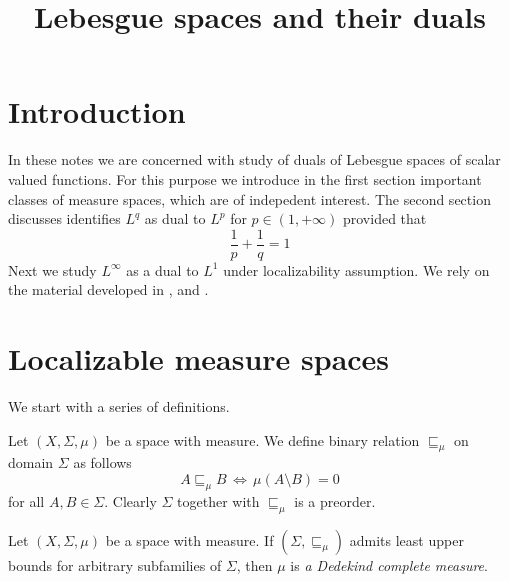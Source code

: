 



\title{Lebesgue spaces and their duals}
\date{}
\maketitle


\section{Introduction}
\noindent
In these notes we are concerned with study of duals of Lebesgue spaces of scalar valued functions. For this purpose we introduce in the first section important classes of measure spaces, which are of indepedent interest. The second section discusses identifies $L^q$ as dual to $L^p$ for $p\in (1,+\infty)$ provided that
$$\frac{1}{p} + \frac{1}{q} = 1$$
Next we study $L^{\infty}$ as a  dual to $L^1$ under localizability assumption. We rely on the material developed in \cite{Introduction_to_measure_theory}, \cite{Integration} and \cite{Radon_Nikodym_Hahn_Jordan_Lebesgue_decomposition}.


\section{Localizable measure spaces}
\noindent
We start with a series of definitions.

\begin{definition}
  Let $(X,\Sigma,\mu)$ be a space with measure. We define binary relation $\sqsubseteq_{\mu}$ on domain $\Sigma$ as follows
  $$A \sqsubseteq_{\mu} B\,\Leftrightarrow\,\mu(A\setminus B) = 0$$
  for all $A, B \in \Sigma$. Clearly $\Sigma$ together with $\sqsubseteq_{\mu}$ is a preorder.
\end{definition}

\begin{definition}
  Let $(X,\Sigma,\mu)$ be a space with measure. If $\left(\Sigma, \sqsubseteq_{\mu}\right)$ admits least upper bounds for arbitrary subfamilies of $\Sigma$, then $\mu$ is \textit{a Dedekind complete measure}.
\end{definition}


